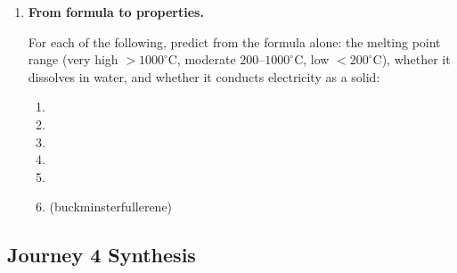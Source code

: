 \documentclass[12pt, a4paper]{book}
\begin{document}
\begin{problembox}
\begin{enumerate}[label=\textbf{\arabic*.}]
  \item \textbf{From formula to properties.}

    For each of the following, predict from the formula alone:
    the melting point range (very high $>1000^\circ$C,
    moderate $200$--$1000^\circ$C, low $<200^\circ$C),
    whether it dissolves in water, and whether it conducts
    electricity as a solid:
    \begin{enumerate}[label=(\alph*)]
      \item {}
      \item {}
      \item {}
      \item {}
      \item {}
      \item {} (buckminsterfullerene)
    \end{enumerate}
\end{enumerate}
\end{problembox}

\subsection*{Journey 4 Synthesis}
\end{document}
